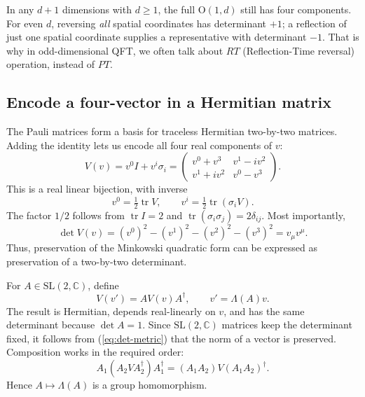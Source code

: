 \documentclass[11pt]{article}
\newcommand{\OO}{\mathrm{O}}
\newcommand{\C}{\mathbb C}
\newcommand{\SL}{\mathrm{SL}}
\newcommand{\tr}{\operatorname{tr}}
\begin{document}
In any \(d+1\) dimensions with \(d\geq1\), the full \(\OO(1,d)\)
still has four components. For even \(d\), reversing \emph{all} spatial
coordinates has determinant \(+1\); a reflection of just one spatial
coordinate supplies a representative with determinant \(-1\). That is why in odd-dimensional QFT, we often talk about $RT$ (Reflection-Time reversal) operation, instead of $PT$.

\subsection{Encode a four-vector in a Hermitian matrix}
The Pauli matrices form a basis for traceless Hermitian two-by-two matrices.
Adding the identity lets us encode all four real components of \(v\):
\begin{equation}
 V(v)=v^0I+v^i\sigma_i
 =\begin{pmatrix}v^0+v^3&v^1-iv^2\\v^1+iv^2&v^0-v^3\end{pmatrix}.
 \label{eq:vector-matrix}
\end{equation}
This is a real linear bijection, with inverse
\begin{equation}
 v^0=\tfrac12\tr V,\qquad v^i=\tfrac12\tr(\sigma_iV).
 \label{eq:trace-inverse}
\end{equation}
The factor \(1/2\) follows from \(\tr I=2\) and
\(\tr(\sigma_i\sigma_j)=2\delta_{ij}\).
Most importantly,
\begin{equation}
 \det V(v)=(v^0)^2-(v^1)^2-(v^2)^2-(v^3)^2=v_\mu v^\mu.
 \label{eq:det-metric}
\end{equation}
Thus, preservation of the Minkowski quadratic form can be expressed as
preservation of a two-by-two determinant.

For \(A\in\SL(2,\C)\), define
\begin{equation}
 V(v')=AV(v)A^\dagger,\qquad v'=\Lambda(A)v.
 \label{eq:cover-map}
\end{equation}
The result is Hermitian, depends real-linearly on \(v\), and has the
same determinant because \(\det A=1\). Since $\SL(2,\mathbb{C})$ matrices keep the determinant fixed, it follows from (\ref{eq:det-metric}) that the norm of a vector is preserved.
Composition works in the required order:
\[
 A_1(A_2VA_2^\dagger)A_1^\dagger
 =(A_1A_2)V(A_1A_2)^\dagger.
\]
Hence \(A\mapsto\Lambda(A)\) is a group homomorphism.
\end{document}
